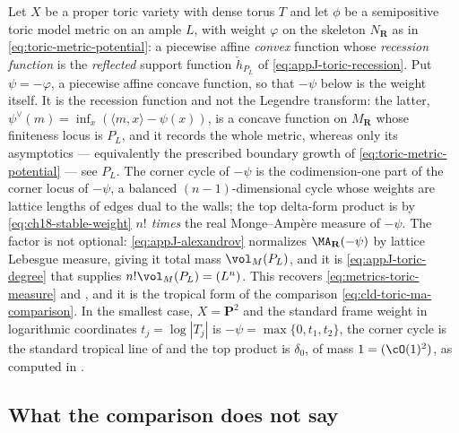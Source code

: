 \begin{example}
\label{ex:ch18-compare-toric}
Let $X$ be a proper toric variety with dense torus $T$ and let $\phi$ be a
semipositive toric model metric on an ample $L$, with weight $\varphi$ on the skeleton
$N_{\mathbf R}$ as in \eqref{eq:toric-metric-potential}: a piecewise affine
\emph{convex} function whose \emph{recession function} is the
\emph{reflected} support function $\check h_{P_L}$ of
\eqref{eq:appJ-toric-recession}.  Put $\psi=-\varphi$, a piecewise affine
concave function, so that $-\psi$ below is the weight itself.  It
is the recession function and not the Legendre transform: the latter,
$\psi^\vee(m)=\inf_{x}(\langle m,x\rangle-\psi(x))$, is a concave function
on $M_{\mathbf R}$ whose finiteness locus is $P_L$, and it records the whole
metric, whereas only its asymptotics --- equivalently the prescribed
boundary growth of \eqref{eq:toric-metric-potential} --- see $P_L$.  The corner cycle of $-\psi$
is the codimension-one part of the corner locus of $-\psi$, a balanced
$(n-1)$-dimensional cycle whose weights are lattice lengths of edges dual to
the walls; the top delta-form product is by \eqref{eq:ch18-stable-weight}
\emph{$n!$ times} the real Monge--Amp\`ere measure of $-\psi$.  The factor
is not optional: \eqref{eq:appJ-alexandrov} normalizes
$\MA_{\mathbf R}(-\psi)$ by lattice Lebesgue measure, giving it total mass
$\vol_M(P_L)$, and it is \eqref{eq:appJ-toric-degree} that supplies
$n!\vol_M(P_L)=(L^n)$.  This recovers \eqref{eq:metrics-toric-measure} and
, and it is the tropical form of the comparison
\eqref{eq:cld-toric-ma-comparison}.  In the smallest case, $X=\mathbf P^2$
and the standard frame weight in logarithmic coordinates
$t_j=\log|T_j|$ is $-\psi=\max\{0,t_1,t_2\}$, the corner cycle is the
standard tropical
line of  and the top product is $\delta_0$, of mass
$1=(\cO(1)^2)$, as computed in
.
\end{example}

\subsection{What the comparison does not say}
\label{sec:ch18-model-limits}

